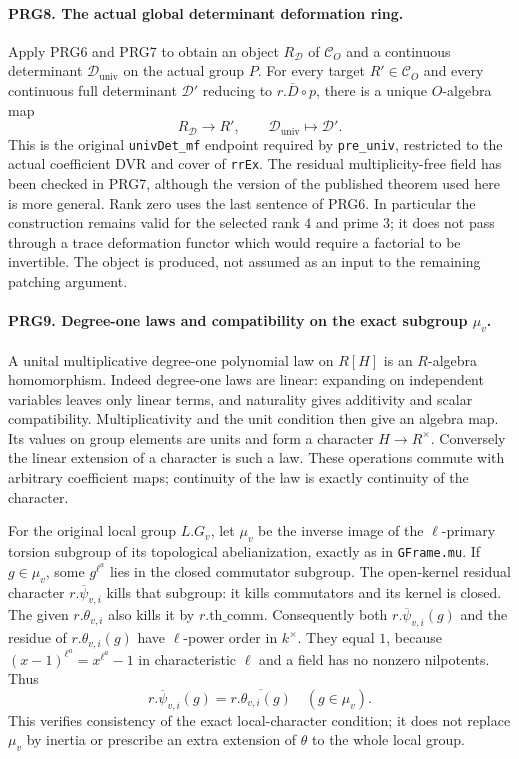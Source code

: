 \paragraph{PRG8. The actual global determinant deformation ring.}
\label{claim:PRG8}
Apply PRG6 and PRG7 to obtain an object \(R_{\mathcal D}\) of
\(\mathcal C_O\) and a continuous determinant
\(\mathcal D_{\mathrm{univ}}\) on the actual group \(P\).
For every target \(R'\in\mathcal C_O\) and every continuous full
determinant \(\mathcal D'\) reducing to \(r.\overline D\circ p\),
there is a unique \(O\)-algebra map
\[
 R_{\mathcal D}\longrightarrow R',\qquad
 \mathcal D_{\mathrm{univ}}\longmapsto\mathcal D'.            \tag{PRG.6}
\]
This is the original \texttt{univDet\_mf} endpoint required by
\texttt{pre\_univ}, restricted to the actual coefficient DVR
and cover of \texttt{rrEx}. The residual multiplicity-free field
has been checked in PRG7, although the version of the published
theorem used here is more general. Rank zero uses the last sentence
of PRG6. In particular the construction remains valid for the
selected rank \(4\) and prime \(3\); it does not pass through a
trace deformation functor which would require a factorial to be
invertible. The object is produced, not assumed as an input to the
remaining patching argument.

\paragraph{PRG9. Degree-one laws and compatibility on the exact subgroup \(\mu_v\).}
\label{claim:PRG9}
A unital multiplicative degree-one polynomial law on \(R[H]\)
is an \(R\)-algebra homomorphism. Indeed degree-one laws are
linear: expanding on independent variables leaves only linear
terms, and naturality gives additivity and scalar compatibility.
Multiplicativity and the unit condition then give an algebra map.
Its values on group elements are units and form a character
\(H\to R^\times\). Conversely the linear extension of a character
is such a law. These operations commute with arbitrary coefficient
maps; continuity of the law is exactly continuity of the character.

For the original local group \(L.G_v\), let \(\mu_v\) be the
inverse image of the \(\ell\)-primary torsion subgroup of its
topological abelianization, exactly as in \texttt{GFrame.mu}.
If \(g\in\mu_v\), some \(g^{\ell^a}\) lies in the closed
commutator subgroup. The open-kernel residual character
\(r.\overline\psi_{v,i}\) kills that subgroup: it kills
commutators and its kernel is closed. The given
\(r.\theta_{v,i}\) also kills it by \(r.\mathrm{th\_comm}\).
Consequently both \(r.\overline\psi_{v,i}(g)\) and the residue
of \(r.\theta_{v,i}(g)\) have \(\ell\)-power order in \(k^\times\).
They equal \(1\), because
\((x-1)^{\ell^a}=x^{\ell^a}-1\) in characteristic \(\ell\)
and a field has no nonzero nilpotents. Thus
\[
 r.\overline\psi_{v,i}(g)=
 \overline{r.\theta_{v,i}(g)}\quad(g\in\mu_v).              \tag{PRG.7}
\]
This verifies consistency of the exact local-character condition;
it does not replace \(\mu_v\) by inertia or prescribe an extra
extension of \(\theta\) to the whole local group.

